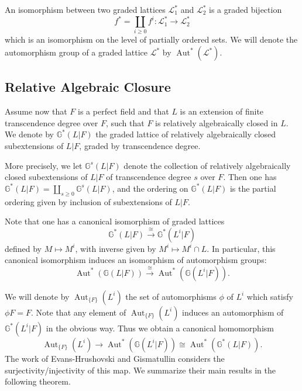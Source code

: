 \documentclass[11pt]{amsart}
\theoremstyle{definition}
\theoremstyle{remark}
\numberwithin{equation}{section}
\DeclareMathOperator{\Aut}{Aut}
\newcommand{\G}{\mathbb{G}}
\newcommand{\Lcal}{\mathcal{L}}
\begin{document}
An isomorphism between two graded lattices $\Lcal_1^*$ and $\Lcal_2^*$ is a graded bijection
\[ f^* = \coprod_{i \geq 0} f^i : \Lcal_1^* \rightarrow \Lcal_2^*\] 
which is an isomorphism on the level of partially ordered sets. 
We will denote the automorphism group of a graded lattice $\Lcal^*$ by $\Aut^*(\Lcal^*)$.

\subsection{Relative Algebraic Closure}
\label{subsection: lattice / acl}

Assume now that $F$ is a perfect field and that $L$ is an extension of finite transcendence degree over $F$, such that $F$ is relatively algebraically closed in $L$.
We denote by $\G^*(L|F)$ the graded lattice of relatively algebraically closed subextensions of $L|F$, graded by transcendence degree.

More precisely, we let $\G^s(L|F)$ denote the collection of relatively algebraically closed subextensions of $L|F$ of transcendence degree $s$ over $F$.
Then one has $\G^*(L|F) = \coprod_{s \geq 0} \G^s(L|F)$, and the ordering on $\G^*(L|F)$ is the partial ordering given by inclusion of subextensions of $L|F$.

Note that one has a canonical isomorphism of graded lattices
\[ \G^*(L|F) \xrightarrow{\cong} \G^*(L^i|F) \]
defined by $M \mapsto M^i$, with inverse given by $M^i \mapsto M^i \cap L$.
In particular, this canonical isomorphism induces an isomorphism of automorphism groups:
\[ \Aut^*(\G(L|F)) \xrightarrow{\cong} \Aut^*(\G(L^i|F)). \]

We will denote by $\Aut_{\{F\}}(L^i)$ the set of automorphisms $\phi$ of $L^i$ which satisfy $\phi F = F$.
Note that any element of $\Aut_{\{F\}}(L^i)$ induces an automorphism of $\G^*(L^i|F)$ in the obvious way.
Thus we obtain a canonical homomorphism
\[ \Aut_{\{F\}}(L^i) \rightarrow \Aut^*(\G(L^i|F)) \cong \Aut^*(\G^*(L|F)). \]
The work of {\sc Evans-Hrushovski} \cite{Evans:1991} \cite{Evans:1995} and {\sc Gismatullin} \cite{Gismatullin:2008} considers the surjectivity/injectivity of this map.
We summarize their main results in the following theorem.
\end{document}
